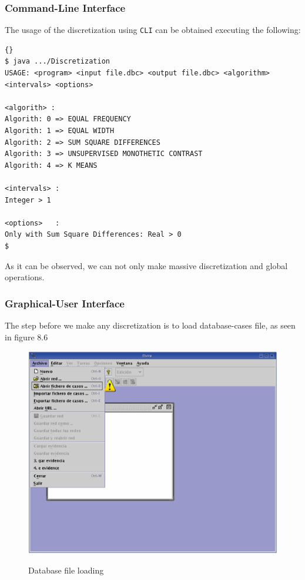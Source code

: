 \subsubsection{Command-Line Interface}
The usage of the discretization using \verb=CLI= can be obtained executing the following:

\begin{lstlisting}[frame=trBL, caption=CLI Help, label=CLIHelp]{}
$ java .../Discretization
USAGE: <program> <input file.dbc> <output file.dbc> <algorithm> 
<intervals> <options>

<algorith> :
Algorith: 0 => EQUAL FREQUENCY
Algorith: 1 => EQUAL WIDTH
Algorith: 2 => SUM SQUARE DIFFERENCES
Algorith: 3 => UNSUPERVISED MONOTHETIC CONTRAST
Algorith: 4 => K MEANS

<intervals> :
Integer > 1

<options>   :
Only with Sum Square Differences: Real > 0
$
\end{lstlisting}

As it can be observed, we can not only make massive discretization and global operations.

\subsubsection{Graphical-User Interface}	
The step before we make any discretization is to load database-cases file, as seen in figure 8.6

\begin{figure}[htb]
\begin{center}
\label{cap08:06}
\includegraphics[width=150mm]{Learning/Preprocessing/fig/figure-8.06.ps} 
\caption{Database file loading}
\end{center}
\end{figure}


